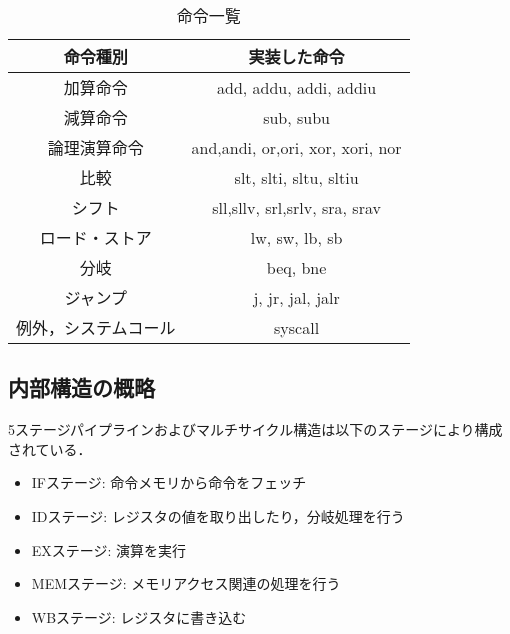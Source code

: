 \documentclass{jarticle}[11pt]
\begin{document}
\begin{table*}[h] %
  \caption{命令一覧}
  \label{命令一覧}
  \begin{center}
  \begin{tabular}{c|c}
  
  \hline \hline

  命令種別 & 
  \multicolumn{1}{c}{実装した命令}
  \\ 
  
  \hline \hline
  
  加算命令&
  add, addu, addi, addiu 
  \\ \hline

  減算命令&
  sub, subu
  \\ \hline

  論理演算命令&
  and,andi, or,ori, xor, xori, nor
  \\ \hline

  比較 &
  slt, slti, sltu, sltiu
  \\ \hline
  
  シフト &
  sll,sllv, srl,srlv, sra, srav
  \\ \hline

  ロード・ストア &
  lw, sw, lb, sb
  \\ \hline
  
  分岐 & 
  beq, bne
  \\ \hline
  
  ジャンプ &
  j, jr, jal, jalr
  \\ \hline

  例外，システムコール &
  syscall
  \\\hline
  \end{tabular}
  \end{center}
  \end{table*}

\subsection{内部構造の概略}

5ステージパイプラインおよびマルチサイクル構造は以下のステージにより構成されている．

\begin{itemize}
  \item IFステージ: 命令メモリから命令をフェッチ
  \item IDステージ: レジスタの値を取り出したり，分岐処理を行う
  \item EXステージ: 演算を実行
  \item MEMステージ: メモリアクセス関連の処理を行う
  \item WBステージ: レジスタに書き込む
\end{itemize}
\end{document}

